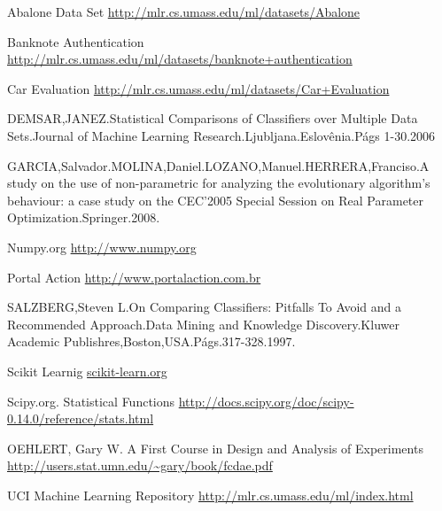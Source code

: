 \documentclass[11pt]{article}
\begin{document}
\newpage
\begin{thebibliography}{Referencias}

Abalone Data Set 
\url{http://mlr.cs.umass.edu/ml/datasets/Abalone}

Banknote Authentication 
\url{http://mlr.cs.umass.edu/ml/datasets/banknote+authentication}

Car Evaluation 
\url{http://mlr.cs.umass.edu/ml/datasets/Car+Evaluation}

DEMSAR,JANEZ.Statistical Comparisons of Classifiers over Multiple Data Sets.Journal of Machine Learning Research.Ljubljana.Eslovênia.Págs 1-30.2006

GARCIA,Salvador.MOLINA,Daniel.LOZANO,Manuel.HERRERA,Franciso.A study on the use of non-parametric for analyzing the evolutionary algorithm's behaviour: a case study on the CEC'2005 Special Session on Real Parameter Optimization.Springer.2008.

Numpy.org
\url{http://www.numpy.org}

Portal Action
\url{http://www.portalaction.com.br}

SALZBERG,Steven L.On Comparing Classifiers: Pitfalls To Avoid and a Recommended Approach.Data Mining and Knowledge Discovery.Kluwer Academic Publishres,Boston,USA.Págs.317-328.1997.

Scikit Learnig 
\url{scikit-learn.org}

Scipy.org. Statistical Functions
\url{http://docs.scipy.org/doc/scipy-0.14.0/reference/stats.html}

 OEHLERT, Gary W. A First Course in Design and Analysis of Experiments
\url{http://users.stat.umn.edu/~gary/book/fcdae.pdf}

UCI Machine Learning Repository
\url{http://mlr.cs.umass.edu/ml/index.html}
\end{thebibliography}
\end{document}
